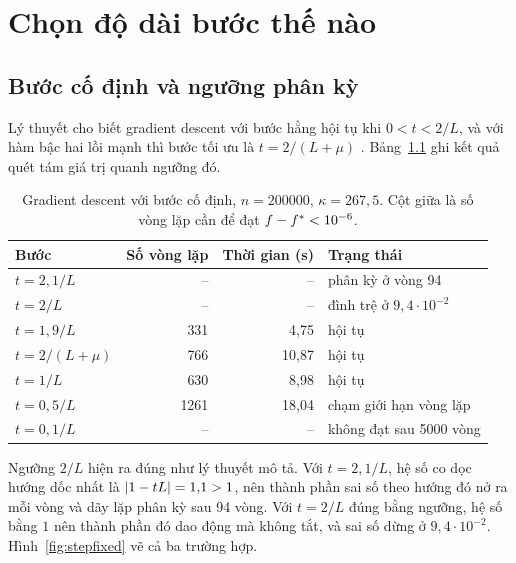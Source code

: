 \documentclass[12pt, a4paper, oneside]{report}
\theoremstyle{definition}
\begin{document}
\chapter{Chọn độ dài bước thế nào}\label{ch:step}

\section{Bước cố định và ngưỡng phân kỳ}

Lý thuyết cho biết gradient descent với bước hằng hội tụ khi $0 < t < 2/L$, và
với hàm bậc hai lồi mạnh thì bước tối ưu là $t = 2/(L+\mu)$
\cite{nesterov2018lectures}. Bảng~\ref{tab:stepfixed} ghi kết quả quét tám giá
trị quanh ngưỡng đó.

\begin{table}[tbp]
  \centering
  \caption{Gradient descent với bước cố định, $n = \num{200000}$,
    $\kappa = 267{,}5$. Cột giữa là số vòng lặp cần để đạt
    $f - f^{*} < 10^{-6}$.}
  \label{tab:stepfixed}
  \begin{tabular}{lrrl}
    \toprule
    Bước & Số vòng lặp & Thời gian (s) & Trạng thái \\
    \midrule
    $t = 2{,}1/L$    & --   & --      & phân kỳ ở vòng 94 \\
    $t = 2/L$        & --   & --      & đình trệ ở $9{,}4 \cdot 10^{-2}$ \\
    $t = 1{,}9/L$    & 331  & 4{,}75  & hội tụ \\
    $t = 2/(L+\mu)$  & 766  & 10{,}87 & hội tụ \\
    $t = 1/L$        & 630  & 8{,}98  & hội tụ \\
    $t = 0{,}5/L$    & 1261 & 18{,}04 & chạm giới hạn vòng lặp \\
    $t = 0{,}1/L$    & --   & --      & không đạt sau \num{5000} vòng \\
    \bottomrule
  \end{tabular}
\end{table}

Ngưỡng $2/L$ hiện ra đúng như lý thuyết mô tả. Với $t = 2{,}1/L$, hệ số co dọc
hướng dốc nhất là $\lvert1 - tL\rvert = 1{,}1 > 1$, nên thành phần sai số theo hướng đó
nở ra mỗi vòng và dãy lặp phân kỳ sau 94 vòng. Với $t = 2/L$ đúng bằng ngưỡng, hệ
số bằng $1$ nên thành phần đó dao động mà không tắt, và sai số dừng ở
$9{,}4 \cdot 10^{-2}$. Hình~\ref{fig:stepfixed} vẽ cả ba trường hợp.
\end{document}
